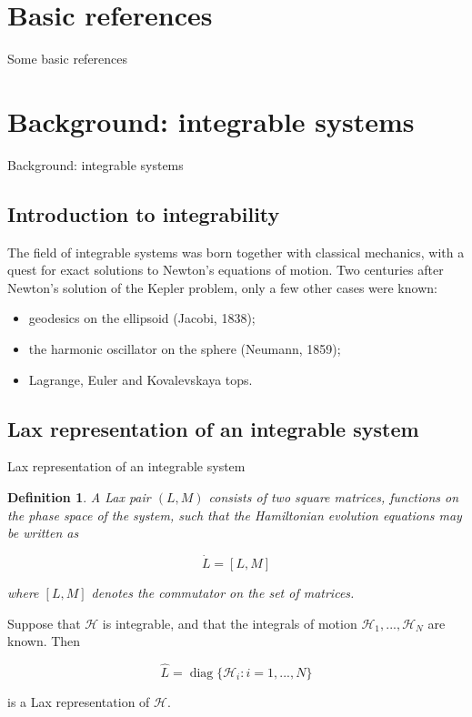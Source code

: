 \documentclass[aspectratio=169, 9pt]{beamer}
\newtheorem{defi}{Definition}
\newcommand{\diag}{\mathop{\mathrm{diag}}}
\begin{document}

\section{Basic references}
\begin{frame}{Some basic references}
\nocite{*}

      
\end{frame}


\section{Background: integrable systems}
\begin{frame}{Background: integrable systems}
\subsection{Introduction to integrability}
The field of integrable systems was born together with classical mechanics, with a quest for exact solutions to Newton's equations of motion. Two centuries after Newton's solution of the Kepler problem, only a few other cases were known:

\vspace{\baselineskip}

\begin{itemize}
    \item geodesics on the ellipsoid (Jacobi, 1838);
    \item the harmonic oscillator on the sphere (Neumann, 1859);
    \item Lagrange, Euler and Kovalevskaya tops.
\end{itemize}

\end{frame}

\subsection{Lax representation of an integrable system}
\begin{frame}[allowframebreaks]{Lax representation of an integrable system}

\begin{defi}
A Lax pair $(L,M)$ consists of two square matrices, functions on the phase space of the system, such that the Hamiltonian evolution equations may be written as

\begin{equation}\label{laxevolution}
\dot L = [L, M]
\end{equation}

where $[L,M]$ denotes the commutator on the set of matrices. 
\end{defi}

Suppose that $\mathcal{H}$ is integrable, and that the integrals of motion $\mathcal{H}_1, ..., \mathcal{H}_N$ are known. Then

\[ \hat L = \diag{ \{\mathcal{H}_i : i=1,...,N \}} \]

is a Lax representation of $\mathcal{H}$.
\end{frame}
\end{document}
